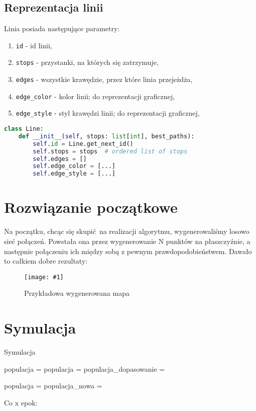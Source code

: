 \documentclass[12pt,a4paper,openright]{mwrep}
\newcommand{\imgcustomsize}[3]{
	\begin{figure}[H]
		\centering
		\texttt{[image: \#1]}
		\caption{#2}
	\end{figure}
}
\newcommand{\img}[2]{\imgcustomsize{#1}{#2}{0.8}}
\begin{document}
\subsection{Reprezentacja linii}
Linia posiada następujące parametry:
\begin{enumerate}
    \item \lstinline{id} - id linii,
    \item \lstinline{stops} - przystanki, na których się zatrzymuje,
    \item \lstinline{edges} - wszystkie krawędzie, przez które linia przejeżdża,
    \item \lstinline{edge_color} - kolor linii; do reprezentacji graficznej,
    \item \lstinline{edge_style} - styl krawędzi linii; do reprezentacji graficznej,
\end{enumerate}


\begin{lstlisting}[language=Python]
class Line:
    def __init__(self, stops: list[int], best_paths):
        self.id = Line.get_next_id()
        self.stops = stops  # ordered list of stops
        self.edges = []
        self.edge_color = [...]
        self.edge_style = [...]
\end{lstlisting}

\section{Rozwiązanie początkowe}
Na początku, chcąc się skupić na realizacji algorytmu, wygenerowaliśmy losowo sieć połączeń. Powstała ona przez wygenerowanie N punktów na płaszczyźnie, a następnie połączeniu ich między sobą z pewnym prawdopodobieństwem. Dawało to całkiem dobre rezultaty:
\img{map_seed_46}{Przykładowa wygenerowana mapa}

\section{Symulacja}
    \begin{algorithm}[H]
		\caption{Symulacja}
		\begin{algorithmic}[1]
			\State populacja = 
			\State {}
				\State populacja = 
				\State populacja\_dopasowanie = 

				\State populacja = 
				\State populacja\_nowa =  

				Co x epok:
					\State {}
			\EndFor
			\EndFunction
		\end{algorithmic}
	\end{algorithm}
\end{document}
